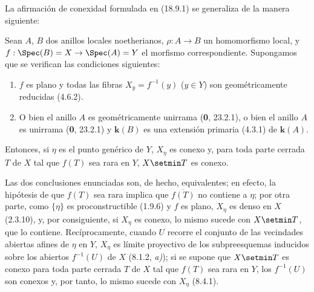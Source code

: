 La afirmación de conexidad formulada en (18.9.1) se generaliza de la manera siguiente:

\begin{theorem}[18.9.7]
\label{IV.18.9.7}
Sean $A$, $B$ dos anillos locales noetherianos, $\rho:A\to B$ un homomorfismo local, y $f:\Spec(B)=X\to\Spec(A)=Y$ el morfismo correspondiente. Supongamos que se verifican las condiciones siguientes:
\begin{enumerate}
  \item[\textup{(i)}] $f$ es plano y todas las fibras $X_y=f^{-1}(y)$ \textup{(}$y\in Y$\textup{)} son geométricamente reducidas \textup{(4.6.2)}.
  \item[\textup{(ii)}] \textup{O bien} el anillo $A$ es geométricamente unirrama \textup{(\textbf 0, 23.2.1), o bien} el anillo $A$ es unirrama \textup{(\textbf 0, 23.2.1)} y $\boldsymbol k(B)$ es una extensión primaria \textup{(4.3.1)} de $\boldsymbol k(A)$.
\end{enumerate}
Entonces, si $\eta$ es el punto genérico de $Y$, $X_\eta$ es conexo y, para toda parte cerrada $T$ de $X$ tal que $f(T)$ sea rara en $Y$, $X\setmin T$ es conexo.
\end{theorem}

Las dos conclusiones enunciadas son, de hecho, equivalentes; en efecto, la hipótesis de que $f(T)$ sea rara implica que $\overline{f(T)}$ no contiene a $\eta$; por otra parte, como $\{\eta\}$ es proconstructible (1.9.6) y $f$ es plano, $X_\eta$ es denso en $X$ (2.3.10), y, por consiguiente, si $X_\eta$ es conexo, lo mismo sucede con $X\setmin T$, que lo contiene. Recíprocamente, cuando $U$ recorre el conjunto de las vecindades abiertas afines de $\eta$ en $Y$, $X_\eta$ es límite proyectivo de los subpreesquemas inducidos sobre los abiertos $f^{-1}(U)$ de $X$ (8.1.2, \emph{a)}); si se supone que $X\setmin T$ es conexo para toda parte cerrada $T$ de $X$ tal que $f(T)$ sea rara en $Y$, los $f^{-1}(U)$ son conexos y, por tanto, lo mismo sucede con $X_\eta$ (8.4.1).

